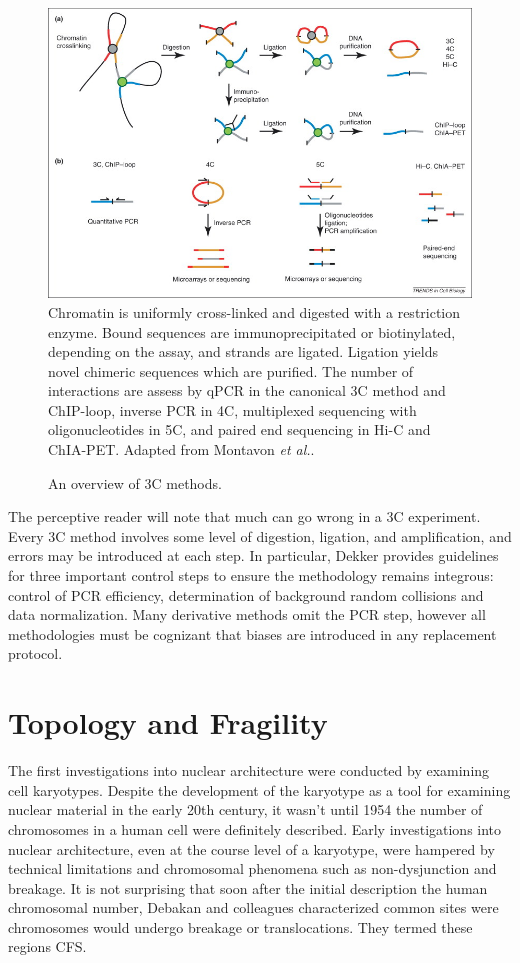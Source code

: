 \begin{figure}[b]
  \centering
  \caption{An overview of \gls{3C} methods.}
  \includegraphics[width=\textwidth]{fig/CompareChromosomeCapture}
  \medskip
  \small
  Chromatin is uniformly cross-linked and digested with a restriction enzyme.
  Bound sequences are immunoprecipitated or biotinylated, depending on the
  assay, and strands are ligated.  Ligation yields novel chimeric sequences
  which are purified.  The number of interactions are assess by qPCR in
  the canonical \gls{3C} method and ChIP-loop, inverse PCR in 4C, multiplexed
  sequencing with oligonucleotides in 5C, and paired end sequencing in Hi-C
  and ChIA-PET\@.  Adapted from Montavon \textit{et al.}\cite{montavon2012}.
\end{figure}


The perceptive reader will note that much can go wrong in a \gls{3C} experiment. Every \gls{3C} method involves some level of digestion, ligation,
and amplification, and errors may be introduced at each step.  In particular, Dekker provides guidelines for three important control steps to
ensure the methodology remains integrous: control of PCR efficiency, determination of background random collisions and data
normalization\cite{dekker2006}.  Many derivative methods omit the PCR step, however all methodologies must be cognizant that
biases are introduced in any replacement protocol.

\section*{Topology and Fragility}

The first investigations into nuclear architecture were conducted by examining cell karyotypes.  Despite the development of the karyotype as a
tool for examining nuclear material in the early 20th century\cite{levitsky1924}, it wasn't until 1954 the number of chromosomes in a human
cell were definitely described\cite{tjio1956}.  Early investigations into nuclear architecture, even at the course level of a karyotype, were
hampered by technical limitations and chromosomal phenomena such as non-dysjunction and breakage.  It is not surprising that soon after the
initial description the human chromosomal number, Debakan and colleagues characterized common sites were chromosomes would undergo breakage or
translocations.  They termed these regions \gls{CFS}\cite{leyden2008}.

